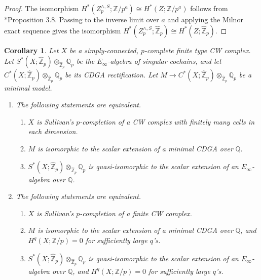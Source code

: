 \documentclass[11pt]{amsart}
\newtheorem{corollary}[theorem]{Corollary}
\theoremstyle{definition}
\numberwithin{equation}{section}
\numberwithin{equation}{section}
\newcommand\QQ{\mathbb{Q}}
\newcommand\ZZ{\mathbb{Z}}
\begin{document}
\begin{proof}
The isomorphism $H^*(Z^{\wedge,S}_{p};\ZZ/p^a)\cong H^*(Z;\ZZ/p^a)$ follows from \cite{Sullivan-1970-unpublished-notes}*{Proposition 3.8}. Passing to the inverse limit over $a$ and applying the Milnor exact sequence gives the isomorphism $H^*(Z^{\wedge,S}_{p};\widehat{\ZZ}_p)\cong H^*(Z;\widehat{\ZZ}_p)$.
\end{proof}


\begin{corollary}\label{Cor: integral lifting of simply-connected p-complete spaces}
Let $X$ be a simply-connected, $p$-complete finite type CW complex. Let $S^*(X;\widehat{\ZZ}_p)\otimes_{\widehat{\ZZ}_p} \QQ_p$ be the $E_{\infty}$-algebra of singular cochains, and let $C^*(X;\widehat{\ZZ}_p)\otimes_{\widehat{\ZZ}_p} \QQ_p$ be its CDGA rectification. Let $M\rightarrow C^*(X;\widehat{\ZZ}_p)\otimes_{\widehat{\ZZ}_p}\QQ_p$ be a minimal model. 
\begin{enumerate}[leftmargin=0.25in]
    \item  The following statements are equivalent.
    \begin{enumerate}[leftmargin=0.27in]
        \item $X$ is Sullivan's $p$-completion of a CW complex with finitely many cells in each dimension.
        \item $M$ is isomorphic to the scalar extension of a minimal CDGA over $\QQ$.
        \item $S^*(X;\widehat{\ZZ}_p)\otimes_{\widehat{\ZZ}_p} \QQ_p$ is quasi-isomorphic to the scalar extension of an $E_{\infty}$-algebra over $\QQ$. 
    \end{enumerate}
    \item The following statements are equivalent.
    \begin{enumerate}[leftmargin=0.27in]
        \item $X$ is Sullivan's $p$-completion of a finite CW complex.
        \item $M$ is isomorphic to the scalar extension of a minimal CDGA over $\QQ$, and $H^{q}(X;\ZZ/p)=0$ for sufficiently large $q$'s.
        \item $S^*(X;\widehat{\ZZ}_p)\otimes_{\widehat{\ZZ}_p} \QQ_p$ is quasi-isomorphic to the scalar extension of an $E_{\infty}$-algebra over $\QQ$, and $H^{q}(X;\ZZ/p)=0$ for sufficiently large $q$'s.
    \end{enumerate}
\end{enumerate}
\end{corollary}
\end{document}
